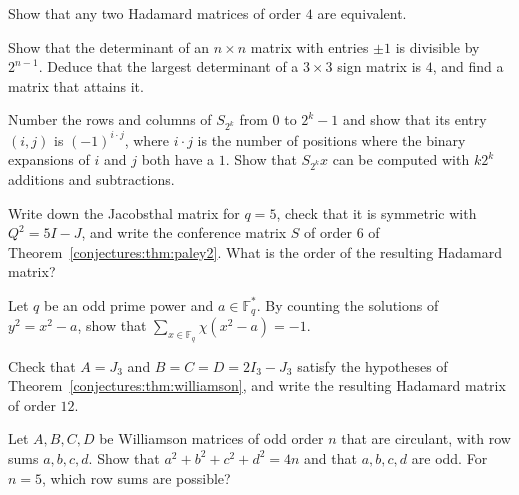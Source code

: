 \begin{exercise}[$\star$]\label{conjectures:ex:order4}
Show that any two Hadamard matrices of order $4$ are equivalent.
\end{exercise}

\begin{exercise}[$\star\star$]\label{conjectures:ex:det3}
Show that the determinant of an $n\times n$ matrix with entries $\pm1$ is divisible by $2^{n-1}$. Deduce that the largest determinant of a $3\times3$
sign matrix is $4$, and find a matrix that attains it.
\end{exercise}

\begin{exercise}[$\star$]\label{conjectures:ex:walsh}
Number the rows and columns of $S_{2^k}$ from $0$ to $2^k-1$ and show that its entry $(i,j)$ is $(-1)^{i\cdot j}$, where $i\cdot j$ is the number of
positions where the binary expansions of $i$ and $j$ both have a $1$. Show that $S_{2^k}x$ can be computed with $k2^k$ additions and subtractions.
\end{exercise}

\begin{exercise}[$\star$]\label{conjectures:ex:paley5}
Write down the Jacobsthal matrix for $q=5$, check that it is symmetric with $Q^2=5I-J$, and write the conference matrix $S$ of order $6$ of
Theorem~\ref{conjectures:thm:paley2}. What is the order of the resulting Hadamard matrix?
\end{exercise}

\begin{exercise}[$\star\star$]\label{conjectures:ex:charsum}
Let $q$ be an odd prime power and $a\in\mathbb F_q^*$. By counting the solutions of $y^2=x^2-a$, show that $\sum_{x\in\mathbb F_q}\chi(x^2-a)=-1$.
\end{exercise}

\begin{exercise}[$\star$]\label{conjectures:ex:williamson3}
Check that $A=J_3$ and $B=C=D=2I_3-J_3$ satisfy the hypotheses of Theorem~\ref{conjectures:thm:williamson}, and write the resulting Hadamard matrix of order $12$.
\end{exercise}

\begin{exercise}[$\star\star$]\label{conjectures:ex:williamsonsums}
Let $A,B,C,D$ be Williamson matrices of odd order $n$ that are circulant, with row sums $a,b,c,d$. Show that $a^2+b^2+c^2+d^2=4n$ and that $a,b,c,d$ are
odd. For $n=5$, which row sums are possible?
\end{exercise}

